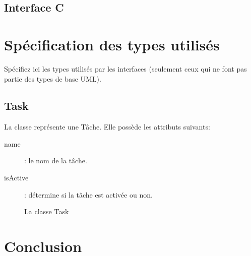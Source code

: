 	\subsection{Interface C}

\section{Spécification des types utilisés}

Spécifiez ici les types utilisés par les interfaces (seulement ceux qui ne font pas partie des types de base UML).

\subsection{Task}

	La classe  représente une Tâche. Elle possède les attributs suivants:
	\begin{description}
		\item[name]: le nom de la tâche. 
		\item[isActive]: détermine si la tâche est activée ou non.  
	\end{description}

\begin{figure}[htbp]
	\centering
	\caption{La classe Task}
	\label{fig:taks}
\end{figure}

\section{Conclusion}
